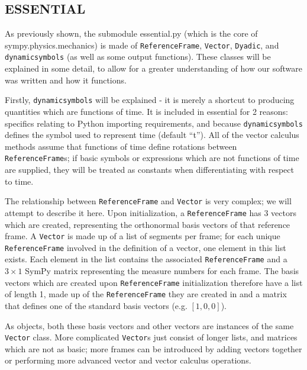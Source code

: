 \documentclass[twocolumn,10pt]{asme2e}
\begin{document}
\subsection*{ESSENTIAL}
As previously shown, the submodule essential.py (which is the core of
sympy.physics.mechanics) is made of \verb|ReferenceFrame|, \verb|Vector|,
\verb|Dyadic|, and \verb|dynamicsymbols| (as well as some output functions).
These classes will be explained in some detail, to allow for a greater
understanding of how our software was written and how it functions.

Firstly, \verb|dynamicsymbols| will be explained - it is merely a shortcut to
producing quantities which are functions of time.
It is included in essential for 2 reasons: specifics relating to Python
importing requirements, and because \verb|dynamicsymbols| defines the symbol
used to represent time (default ``t'').
All of the vector calculus methods assume that functions of time define
rotations between \verb|ReferenceFrame|s; if basic symbols or expressions which
are not functions of time are supplied, they will be treated as constants when
differentiating with respect to time.

The relationship between \verb|ReferenceFrame| and \verb|Vector| is very
complex; we will attempt to describe it here.
Upon initialization, a \verb|ReferenceFrame| has 3 vectors which are created,
representing the orthonormal basis vectors of that reference frame.
A \verb|Vector| is made up of a list of segments per frame; for each unique
\verb|ReferenceFrame| involved in the definition of a vector, one element in
this list exists.
Each element in the list contains the associated \verb|ReferenceFrame| and a
$3\times1$ SymPy matrix representing the measure numbers for each frame.
The basis vectors which are created upon \verb|ReferenceFrame| initialization
therefore have a list of length 1, made up of the \verb|ReferenceFrame| they
are created in and a matrix that defines one of the standard basis vectors
(e.g. $[1, 0, 0]$).

As objects, both these basis vectors and other vectors are instances of the
same \verb|Vector| class.
More complicated \verb|Vector|s just consist of longer lists, and matrices
which are not as basic; more frames can be introduced by adding vectors
together or performing more advanced vector and vector calculus operations.
\end{document}
